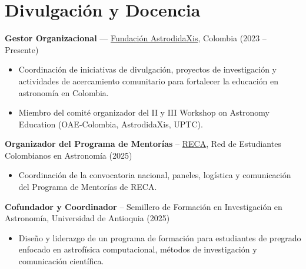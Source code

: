 \section*{Divulgación y Docencia}
\textbf{Gestor Organizacional} — \href{https://sites.google.com/view/astrodidaxis/home?authuser=0}{Fundación AstrodidaXis}, Colombia (2023 -- Presente)
\begin{itemize}
    \item Coordinación de iniciativas de divulgación, proyectos de investigación y actividades de acercamiento comunitario para fortalecer la educación en astronomía en Colombia.
    \item Miembro del comité organizador del II y III Workshop on Astronomy Education (OAE-Colombia, AstrodidaXis, UPTC).
\end{itemize}

\textbf{Organizador del Programa de Mentorías} -- \href{https://www.astroreca.org/en}{RECA}, Red de Estudiantes Colombianos en Astronomía (2025)
\begin{itemize}
    \item Coordinación de la convocatoria nacional, paneles, logística y comunicación del Programa de Mentorías de RECA.
\end{itemize}

\textbf{Cofundador y Coordinador} -- Semillero de Formación en Investigación en Astronomía, Universidad de Antioquia (2025)
\begin{itemize}
    \item Diseño y liderazgo de un programa de formación para estudiantes de pregrado enfocado en astrofísica computacional, métodos de investigación y comunicación científica.
\end{itemize}

